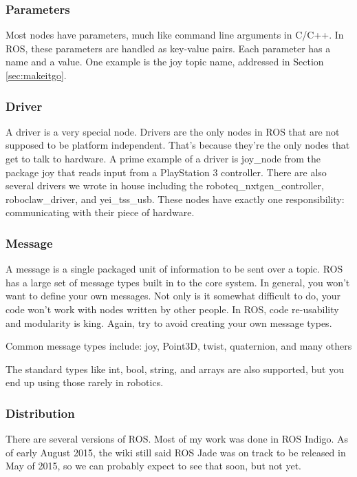 \subsubsection{Parameters}

Most nodes have parameters, much like command line arguments in C/C++. In ROS, these parameters are handled as key-value pairs. Each parameter has a name and a value. One example is the joy topic name, addressed in Section \ref{sec:makeitgo}.

\subsubsection{Driver}

A driver is a very special node. Drivers are the only nodes in ROS that are not supposed to be platform independent. That's because they're the only nodes that get to talk to hardware. A prime example of a driver is joy\_node from the package joy that reads input from a PlayStation 3 controller. There are also several drivers we wrote in house including the roboteq\_nxtgen\_controller, roboclaw\_driver, and yei\_tss\_usb. These nodes have exactly one responsibility: communicating with their piece of hardware. 

\subsubsection{Message}

A message is a single packaged unit of information to be sent over a topic. ROS has a large set of message types built in to the core system. In general, you won't want to define your own messages. Not only is it somewhat difficult to do, your code won't work with nodes written by other people. In ROS, code re-usability and modularity is king. Again, try to avoid creating your own message types.

Common message types include: joy, Point3D, twist, quaternion, and many others

The standard types like int, bool, string, and arrays are also supported, but you end up using those rarely in robotics.

\subsubsection{Distribution}

There are several versions of ROS. Most of my work was done in ROS Indigo. As of early August 2015, the wiki still said ROS Jade was on track to be released in May of 2015, so we can probably expect to see that soon, but not yet.

